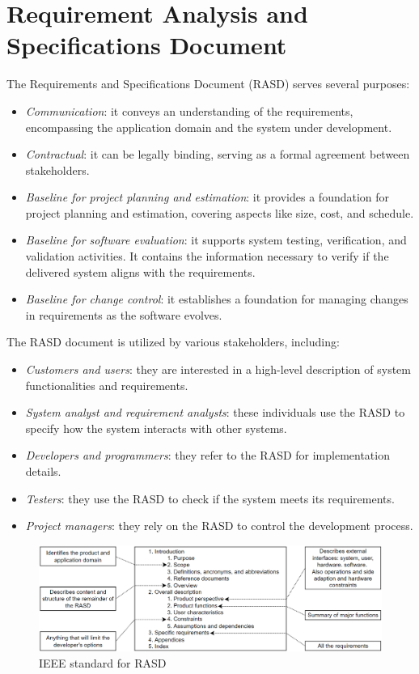 \section{Requirement Analysis and Specifications Document}

The Requirements and Specifications Document (RASD) serves several purposes:
\begin{itemize}
    \item \textit{Communication}: it conveys an understanding of the requirements, encompassing the application domain and the system under development.
    \item \textit{Contractual}: it can be legally binding, serving as a formal agreement between stakeholders.
    \item \textit{Baseline for project planning and estimation}: it provides a foundation for project planning and estimation, covering aspects like size, cost, and schedule.
    \item \textit{Baseline for software evaluation}: it supports system testing, verification, and validation activities. 
        It contains the information necessary to verify if the delivered system aligns with the requirements.
    \item \textit{Baseline for change control}: it establishes a foundation for managing changes in requirements as the software evolves.
\end{itemize}
The RASD document is utilized by various stakeholders, including:
\begin{itemize}
    \item \textit{Customers and users}: they are interested in a high-level description of system functionalities and requirements.
    \item \textit{System analyst and requirement analysts}: these individuals use the RASD to specify how the system interacts with other systems.
    \item \textit{Developers and programmers}: they refer to the RASD for implementation details.
    \item \textit{Testers}: they use the RASD to check if the system meets its requirements.
    \item \textit{Project managers}: they rely on the RASD to control the development process.
\end{itemize}
\begin{figure}[H]
    \centering
    \includegraphics[width=1\linewidth]{images/RASD.png}
    \caption{IEEE standard for RASD}
\end{figure}